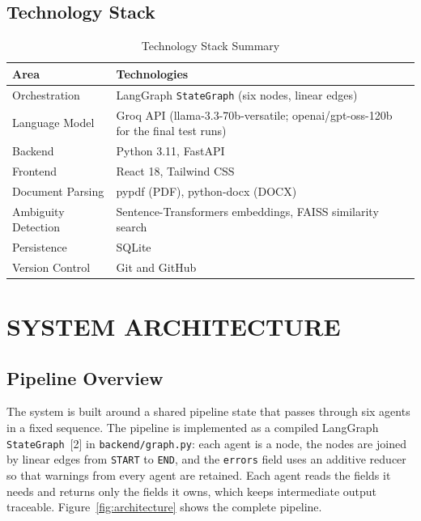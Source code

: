 \section{Technology Stack}
\begin{table}[H]
\centering
\caption{Technology Stack Summary}
\label{tab:techstack}
\begin{tabularx}{\textwidth}{|p{3.2cm}|X|}
\hline
\textbf{Area} & \textbf{Technologies} \\
\hline
Orchestration & LangGraph \texttt{StateGraph} (six nodes, linear edges) \\
\hline
Language Model & Groq API (llama-3.3-70b-versatile; openai/gpt-oss-120b for the final test runs) \\
\hline
Backend & Python 3.11, FastAPI \\
\hline
Frontend & React 18, Tailwind CSS \\
\hline
Document Parsing & pypdf (PDF), python-docx (DOCX) \\
\hline
Ambiguity Detection & Sentence-Transformers embeddings, FAISS similarity search \\
\hline
Persistence & SQLite \\
\hline
Version Control & Git and GitHub \\
\hline
\end{tabularx}
\end{table}

\clearpage
\setcounter{chapter}{2}\setcounter{table}{0}\setcounter{figure}{0}
\chapter{SYSTEM ARCHITECTURE}

\section{Pipeline Overview}
\vspace{0.25cm}
The system is built around a shared pipeline state that passes through six
agents in a fixed sequence. The pipeline is implemented as a compiled
LangGraph \texttt{StateGraph}~[2] in \texttt{backend/graph.py}: each agent is a node,
the nodes are joined by linear edges from \texttt{START} to \texttt{END}, and the
\texttt{errors} field uses an additive reducer so that warnings from every
agent are retained. Each agent reads the fields it needs and returns only
the fields it owns, which keeps intermediate output traceable.
Figure~\ref{fig:architecture} shows the complete pipeline.

